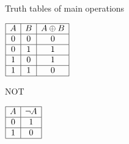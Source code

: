 \begin{namedframe}{Truth tables of main operations}
\begin{center}
\begin{minipage}[t]{0.45\textwidth}
\begin{table}
\begin{math}
\begin{array}{|c|c|c|}
							\hline
							A & B & A \oplus B\\\hline
							0 & 0 & 0\\\hline
							0 & 1 & 1\\\hline
							1 & 0 & 1\\\hline
							1 & 1 & 0\\\hline
						\end{array}
					\end{math}
				\end{table}
				\begin{table}
					\caption{NOT}
					\begin{math}
						\begin{array}{|c|c|}
							\hline
							A & \neg A\\\hline
							0 & 1\\\hline
							1 & 0\\\hline
						\end{array}
					\end{math}
				\end{table}
			\end{minipage}
		\end{center}
	\end{namedframe}
